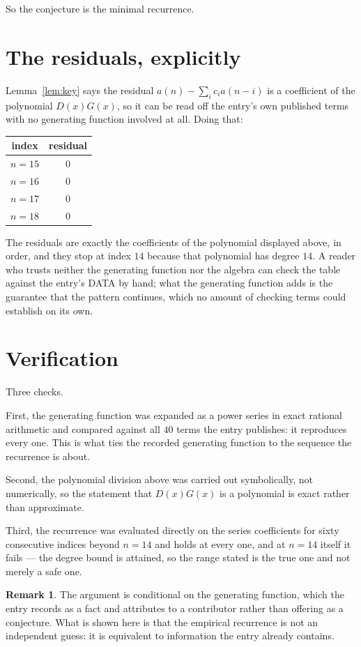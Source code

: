 \documentclass[11pt,a4paper]{article}
\theoremstyle{plain}
\theoremstyle{definition}
\newtheorem{remark}[theorem]{Remark}
\begin{document}
So the conjecture is the minimal recurrence.

\section{The residuals, explicitly}

Lemma~\ref{lem:key} says the residual $a(n)-\sum_ic_ia(n-i)$ is a coefficient of the
polynomial $D(x)G(x)$, so it can be read off the entry's own published terms with no
generating function involved at all. Doing that:
\begin{center}
\begin{tabular}{cc}
index & residual \\ \hline
$n=15$ & $0$ \\
$n=16$ & $0$ \\
$n=17$ & $0$ \\
$n=18$ & $0$
\end{tabular}
\end{center}
The residuals are exactly the coefficients of the polynomial displayed above, in order, and
they stop at index $14$ because that polynomial has degree $14$. A reader who trusts
neither the generating function nor the algebra can check the table against the entry's DATA
by hand; what the generating function adds is the guarantee that the pattern continues, which
no amount of checking terms could establish on its own.

\section{Verification}

Three checks.

First, the generating function was expanded as a power series in exact rational arithmetic and
compared against all $40$ terms the entry publishes: it reproduces every one. This is
what ties the recorded generating function to the sequence the recurrence is about.

Second, the polynomial division above was carried out symbolically, not numerically, so the
statement that $D(x)G(x)$ is a polynomial is exact rather than approximate.

Third, the recurrence was evaluated directly on the series coefficients for sixty consecutive
indices beyond $n=14$ and holds at every one, and at $n=14$ itself it fails --- the
degree bound is attained, so the range stated is the true one and not merely a safe one.

\begin{remark}
The argument is conditional on the generating function, which the entry records as a fact and
attributes to a contributor rather than offering as a conjecture. What is shown here is that
the empirical recurrence is not an independent guess: it is equivalent to information the
entry already contains.
\end{remark}
\end{document}

